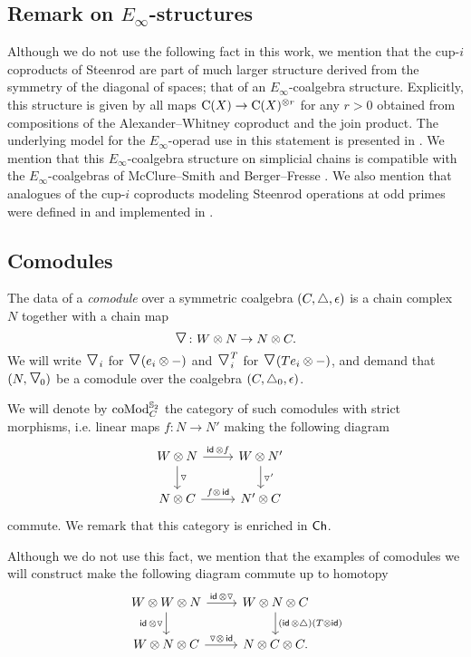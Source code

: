 \subsection{Remark on $E_\infty$-structures}

Although we do not use the following fact in this work, we mention that the cup-$i$ coproducts of Steenrod are part of much larger structure derived from the symmetry of the diagonal of spaces; that of an $E_\infty$-coalgebra structure.
Explicitly, this structure is given by all maps $\operatorname{C}(X) \to \operatorname{C}(X)^{\otimes r}$ for any $r > 0$ obtained from compositions of the Alexander--Whitney coproduct and the join product.
The underlying model for the $E_\infty$-operad use in this statement is presented in \cite{medina2020prop1, medina2021prop2}.
We mention that this $E_\infty$-coalgebra structure on simplicial chains is compatible with the $E_\infty$-coalgebras of McClure--Smith \cite{mcclure2003multivariable} and Berger--Fresse \cite{berger2004combinatorial}.
We also mention that analogues of the cup-$i$ coproducts modeling Steenrod operations at odd primes were defined in \cite{medina2021may_st} and implemented in \cite{medina2021comch}.

\subsection{Comodules}

The data of a \textit{comodule} over a symmetric coalgebra $(C, \triangle, \operatorname{\epsilon})$ is a chain complex $N$ together with a chain map
\[
\text{\Large$\triangledown$} \colon W \otimes N \to N \otimes C.
\]
We will write $\text{\Large$\triangledown$}_i$ for $\text{\Large$\triangledown$}(e_i \otimes -)$ and $\text{\Large$\triangledown$}_i^T$ for $\text{\Large$\triangledown$}(Te_i \otimes -)$, and demand that $(N, \text{\Large$\triangledown$}_{\!0})$ be a comodule over the coalgebra $(C, \triangle_0, \operatorname{\epsilon})$.

We will denote by $\operatorname{coMod}_C^{\mathbb{S}_2}$ the category of such comodules with strict morphisms, i.e. linear maps $f \colon N \to N'$ making the following diagram
\[
\begin{tikzcd}
	W \ot N \arrow[d, "\triangledown"] \arrow[r, "\id\, \ot f"] &
	W \ot N' \arrow[d, "\triangledown'"] & \\
	N \ot C \arrow[r, "f \ot\, \id"] &
	N' \ot C
\end{tikzcd}
\]
commute.
We remark that this category is enriched in $\mathsf{Ch}$.

Although we do not use this fact, we mention that the examples of comodules we will construct make the following diagram commute up to homotopy
\[
\begin{tikzcd}
	W \ot W \ot N \arrow[r, "\id\, \ot \triangledown"] \arrow[d, "\id\, \ot \triangledown"'] &
	W \ot N \ot C \arrow[d, "(\id\, \ot \triangle)(T \ot \id)"] \\
	W \ot N \ot C \arrow[r, "\triangledown \ot\, \id"] &
	N \ot C \ot C.
\end{tikzcd}
\]

